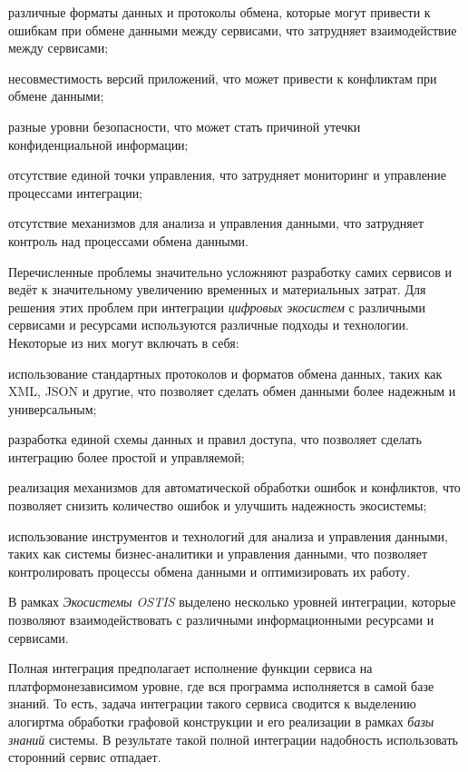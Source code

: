 \begin{textitemize}
    \item различные форматы данных и протоколы обмена, которые могут привести к ошибкам при обмене данными между сервисами, что затрудняет взаимодействие между сервисами;
    \item несовместимость версий приложений, что может привести к конфликтам при обмене данными;
    \item разные уровни безопасности, что может стать причиной утечки конфиденциальной информации;
    \item отсутствие единой точки управления, что затрудняет мониторинг и управление процессами интеграции;
    \item отсутствие механизмов для анализа и управления данными, что затрудняет контроль над процессами обмена данными.
\end{textitemize}

Перечисленные проблемы значительно усложняют разработку самих сервисов и ведёт к значительному увеличению временных и материальных затрат. Для решения этих проблем при интеграции \textit{цифровых экосистем} с различными сервисами и ресурсами используются различные подходы и технологии. Некоторые из них могут включать в себя:

\begin{textitemize}
\item использование стандартных протоколов и форматов обмена данных, таких как XML, JSON и другие, что позволяет сделать обмен данными более надежным и универсальным;
\item разработка единой схемы данных и правил доступа, что позволяет сделать интеграцию более простой и управляемой;
\item реализация механизмов для автоматической обработки ошибок и конфликтов, что позволяет снизить количество ошибок и улучшить надежность экосистемы;
\item использование инструментов и технологий для анализа и управления данными, таких как системы бизнес-аналитики и управления данными, что позволяет контролировать процессы обмена данными и оптимизировать их работу.
\end{textitemize}


В рамках \textit{Экосистемы OSTIS} выделено несколько уровней интеграции, которые позволяют взаимодействовать с различными информационными ресурсами и сервисами. 

Полная интеграция предполагает исполнение функции сервиса на платформонезависимом уровне, где вся программа исполняется в самой базе знаний. То есть, задача интеграции такого сервиса сводится к выделению алогиртма обработки графовой конструкции и его реализации в рамках \textit{базы знаний} системы. В результате такой полной интеграции надобность использовать сторонний сервис отпадает. 

